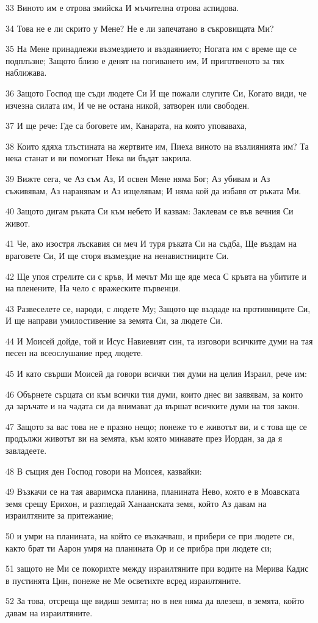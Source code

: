 \par 33 Виното им е отрова змийска И мъчителна отрова аспидова.
\par 34 Това не е ли скрито у Мене? Не е ли запечатано в съкровищата Ми?
\par 35 На Мене принадлежи възмездието и въздаянието; Ногата им с време ще се подплъзне; Защото близо е денят на погиването им, И приготвеното за тях наближава.
\par 36 Защото Господ ще съди людете Си И ще пожали слугите Си, Когато види, че изчезна силата им, И че не остана никой, затворен или свободен.
\par 37 И ще рече: Где са боговете им, Канарата, на която уповаваха,
\par 38 Които ядяха тлъстината на жертвите им, Пиеха виното на възлиянията им? Та нека станат и ви помогнат Нека ви бъдат закрила.
\par 39 Вижте сега, че Аз съм Аз, И освен Мене няма Бог; Аз убивам и Аз съживявам, Аз наранявам и Аз изцелявам; И няма кой да избавя от ръката Ми.
\par 40 Защото дигам ръката Си към небето И казвам: Заклевам се във вечния Си живот.
\par 41 Че, ако изостря лъскавия си меч И туря ръката Си на съдба, Ще въздам на враговете Си, И ще сторя възмездие на ненавистниците Си.
\par 42 Ще упоя стрелите си с кръв, И мечът Ми ще яде меса С кръвта на убитите и на пленените, На чело с вражеските първенци.
\par 43 Развеселете се, народи, с людете Му; Защото ще въздаде на противниците Си, И ще направи умилостивение за земята Си, за людете Си.
\par 44 И Моисей дойде, той и Исус Навиевият син, та изговори всичките думи на тая песен на всеослушание пред людете.
\par 45 И като свърши Моисей да говори всички тия думи на целия Израил, рече им:
\par 46 Обърнете сърцата си към всички тия думи, които днес ви заявявам, за които да заръчате и на чадата си да внимават да вършат всичките думи на тоя закон.
\par 47 Защото за вас това не е празно нещо; понеже то е животът ви, и с това ще се продължи животът ви на земята, към която минавате през Иордан, за да я завладеете.
\par 48 В същия ден Господ говори на Моисея, казвайки:
\par 49 Възкачи се на тая аваримска планина, планината Нево, която е в Моавската земя срещу Ерихон, и разгледай Ханаанската земя, който Аз давам на израилтяните за притежание;
\par 50 и умри на планината, на който се възкачваш, и прибери се при людете си, както брат ти Аарон умря на планината Ор и се прибра при людете си;
\par 51 защото не Ми се покорихте между израилтяните при водите на Мерива Кадис в пустинята Цин, понеже не Ме осветихте всред израилтяните.
\par 52 За това, отсреща ще видиш земята; но в нея няма да влезеш, в земята, който давам на израилтяните.


